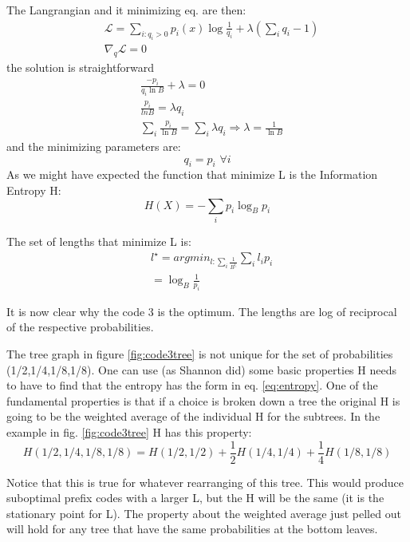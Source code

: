 The Langrangian and it minimizing eq. are then:
\begin{eqnarray}
&\mathcal{L} = \sum_{i: q_i > 0}p_i(x)\log\frac{1}{q_i} + \lambda \left(\sum_i q_i - 1\right ) \\
&\nabla_q\mathcal{L} = 0 
\end{eqnarray}
the solution is straightforward
\begin{eqnarray}
&\frac{-p_i}{q_i \ln B} + \lambda = 0 \\
&\frac{p_i}{lnB} = \lambda q_i  \\
&\sum_i\frac{p_i}{\ln B} = \sum_i\lambda q_i \Longrightarrow \lambda = \frac{1}{\ln B} 
\end{eqnarray}
and the minimizing parameters are: $$q_i = p_i\,\, \forall i$$
As we might have expected the function that minimize L is the Information Entropy  H:
\begin{equation}
	H(X) = -\sum_i p_i\log_B p_i
	\label{eq:entropy}
\end{equation}

The set of lengths that minimize L is:
\begin{eqnarray}
&l^\star = argmin_{l: \sum_{i}\frac{1}{B^{l_i}}} \sum_i l_i p_i\\
&= \log_B \frac{1}{p_i}
\end{eqnarray}

\begin{info}
	It is now clear why the code 3 is the optimum. The lengths are log of  reciprocal of the respective probabilities. 
\end{info}

\begin{info}
 The tree graph in figure \ref{fig:code3tree} is not unique for the set of probabilities (1/2,1/4,1/8,1/8). One can use (as Shannon did) some basic properties H needs to have to find that the entropy has the form in eq. \ref{eq:entropy}. One of the fundamental properties is that if a choice is broken down a tree the original H is going to be the weighted average of the individual H for the subtrees. In the example in fig. \ref{fig:code3tree} H has this property: 
 \begin{equation}
	 H(1/2,1/4,1/8,1/8) = H(1/2,1/2) + \frac{1}{2}H(1/4,1/4) + \frac{1}{4}H(1/8,1/8)
	\label{eq:entropybootstrap}	 
\end{equation} 

Notice that this is true for whatever rearranging of this tree. This would produce suboptimal prefix codes with a larger L, but the H will be the same (it is the stationary point for L). The property about the weighted average just pelled out will  hold for any tree that have the same probabilities at the bottom leaves. 
\end{info}

